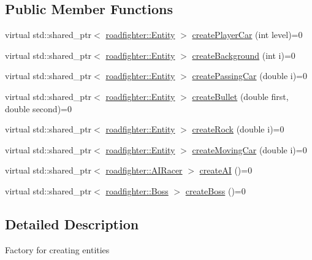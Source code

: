 \subsection*{Public Member Functions}
\begin{DoxyCompactItemize}
\item 
virtual std\+::shared\+\_\+ptr$<$ \hyperlink{classroadfighter_1_1Entity}{roadfighter\+::\+Entity} $>$ \hyperlink{classroadfighter_1_1EntityFactory_a8fefd94a197c87544805461761fc111c}{create\+Player\+Car} (int level)=0
\item 
virtual std\+::shared\+\_\+ptr$<$ \hyperlink{classroadfighter_1_1Entity}{roadfighter\+::\+Entity} $>$ \hyperlink{classroadfighter_1_1EntityFactory_ab3586917a6ef9d3a92b825f908132e02}{create\+Background} (int i)=0
\item 
virtual std\+::shared\+\_\+ptr$<$ \hyperlink{classroadfighter_1_1Entity}{roadfighter\+::\+Entity} $>$ \hyperlink{classroadfighter_1_1EntityFactory_ab318794f4effc0c2195fae5da267d900}{create\+Passing\+Car} (double i)=0
\item 
virtual std\+::shared\+\_\+ptr$<$ \hyperlink{classroadfighter_1_1Entity}{roadfighter\+::\+Entity} $>$ \hyperlink{classroadfighter_1_1EntityFactory_a2d4319aef20024f83e7c3189e92c89e1}{create\+Bullet} (double first, double second)=0
\item 
virtual std\+::shared\+\_\+ptr$<$ \hyperlink{classroadfighter_1_1Entity}{roadfighter\+::\+Entity} $>$ \hyperlink{classroadfighter_1_1EntityFactory_a3bcb7e8b8ca62628c842962cfbba50be}{create\+Rock} (double i)=0
\item 
virtual std\+::shared\+\_\+ptr$<$ \hyperlink{classroadfighter_1_1Entity}{roadfighter\+::\+Entity} $>$ \hyperlink{classroadfighter_1_1EntityFactory_a53cc68cc3f7365e4ded258ea9b281b45}{create\+Moving\+Car} (double i)=0
\item 
virtual std\+::shared\+\_\+ptr$<$ \hyperlink{classroadfighter_1_1AIRacer}{roadfighter\+::\+A\+I\+Racer} $>$ \hyperlink{classroadfighter_1_1EntityFactory_ae50d1b8cbf0b63dfbedca775781fbda0}{create\+AI} ()=0
\item 
virtual std\+::shared\+\_\+ptr$<$ \hyperlink{classroadfighter_1_1Boss}{roadfighter\+::\+Boss} $>$ \hyperlink{classroadfighter_1_1EntityFactory_ae7a09423660432e744ed35f5f04b0931}{create\+Boss} ()=0
\end{DoxyCompactItemize}


\subsection{Detailed Description}
Factory for creating entities 

